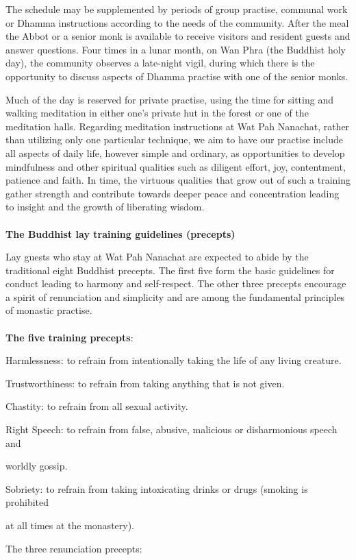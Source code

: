 The schedule may be supplemented by periods of group practise,
communal work or Dhamma instructions according to the needs of the
community. After the meal the Abbot or a senior monk is available to
receive visitors and resident guests and answer questions. Four times in
a lunar month, on Wan Phra (the Buddhist holy day), the community
observes a late-night vigil, during which there is the opportunity to
discuss aspects of Dhamma practise with one of the senior monks.

Much of the day is reserved for private practise, using the time for
sitting and walking meditation in either one's private hut in the forest
or one of the meditation halls. Regarding meditation instructions at Wat
Pah Nanachat, rather than utilizing only one particular technique, we
aim to have our practise include all aspects of daily life, however
simple and ordinary, as opportunities to develop mindfulness and other
spiritual qualities such as diligent effort, joy, contentment, patience
and faith. In time, the virtuous qualities that grow out of such a
training gather strength and contribute towards deeper peace and
concentration leading to insight and the growth of liberating
wisdom.\\\\\textbf{The Buddhist lay training guidelines (precepts)}

Lay guests who stay at Wat Pah Nanachat are expected to abide by the
traditional eight Buddhist precepts. The first five form the basic
guidelines for conduct leading to harmony and self-respect. The other
three precepts encourage a spirit of renunciation and simplicity and are
among the fundamental principles of monastic practise.\\\\\textbf{The
five training precepts}:

Harmlessness: to refrain from intentionally taking the life of any
living creature.

Trustworthiness: to refrain from taking anything that is not given.

Chastity: to refrain from all sexual activity.

Right Speech: to refrain from false, abusive, malicious or disharmonious
speech and

worldly gossip.

Sobriety: to refrain from taking intoxicating drinks or drugs (smoking
is prohibited

at all times at the monastery).

The three renunciation precepts:

